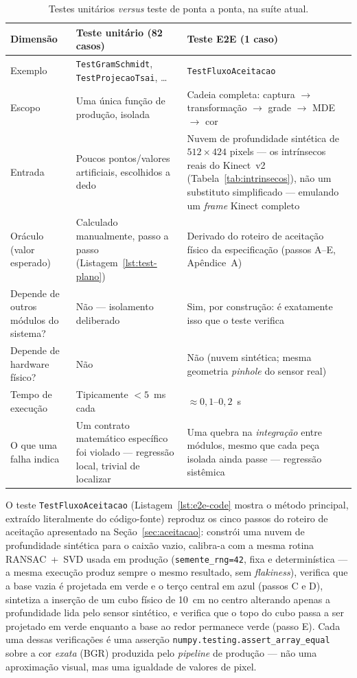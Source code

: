 \begin{table}[!ht]
\centering
\caption{Testes unitários \textit{versus} teste de ponta a ponta, na suíte atual.}
\label{tab:unit-vs-e2e}
\small
\begin{tabularx}{\textwidth}{@{}l X X@{}}
\toprule
\textbf{Dimensão} & \textbf{Teste unitário (82 casos)} & \textbf{Teste E2E (1 caso)} \\
\midrule
Exemplo & \texttt{TestGramSchmidt}, \texttt{TestProjecaoTsai}, \dots & \texttt{TestFluxoAceitacao} \\
Escopo & Uma única função de produção, isolada & Cadeia completa: captura $\to$ transformação $\to$ grade $\to$ MDE $\to$ cor \\
Entrada & Poucos pontos/valores artificiais, escolhidos a dedo & Nuvem de profundidade sintética de $512 \times 424$ pixels — os intrínsecos reais do Kinect~v2 (Tabela~\ref{tab:intrinsecos}), não um substituto simplificado — emulando um \textit{frame} Kinect completo \\
Oráculo (valor esperado) & Calculado manualmente, passo a passo (Listagem~\ref{lst:test-plano}) & Derivado do roteiro de aceitação físico da especificação (passos A--E, Apêndice~A) \\
Depende de outros módulos do sistema? & Não — isolamento deliberado & Sim, por construção: é exatamente isso que o teste verifica \\
Depende de hardware físico? & Não & Não (nuvem sintética; mesma geometria \textit{pinhole} do sensor real) \\
Tempo de execução & Tipicamente $< 5$~ms cada & $\approx 0{,}1$--$0{,}2$~s \\
O que uma falha indica & Um contrato matemático específico foi violado — regressão local, trivial de localizar & Uma quebra na \emph{integração} entre módulos, mesmo que cada peça isolada ainda passe — regressão sistêmica \\
\bottomrule
\end{tabularx}
\end{table}

O teste \texttt{TestFluxoAceitacao} (Listagem~\ref{lst:e2e-code} mostra
o método principal, extraído literalmente do código-fonte) reproduz os
cinco passos do roteiro de aceitação apresentado na
Seção~\ref{sec:aceitacao}: constrói uma nuvem de profundidade sintética
para o caixão vazio, calibra-a com a mesma rotina RANSAC~+~SVD usada em
produção (\texttt{semente\_rng=42}, fixa e determinística — a mesma
execução produz sempre o mesmo resultado, sem \emph{flakiness}),
verifica que a base vazia é projetada em verde e o terço central em
azul (passos C e D), sintetiza a inserção de um cubo físico de 10~cm no
centro alterando apenas a profundidade lida pelo sensor sintético, e
verifica que o topo do cubo passa a ser projetado em verde enquanto a
base ao redor permanece verde (passo E). Cada uma dessas verificações é
uma asserção \texttt{numpy.testing.assert\_array\_equal} sobre a cor
\emph{exata} (BGR) produzida pelo \textit{pipeline} de produção — não
uma aproximação visual, mas uma igualdade de valores de pixel.

